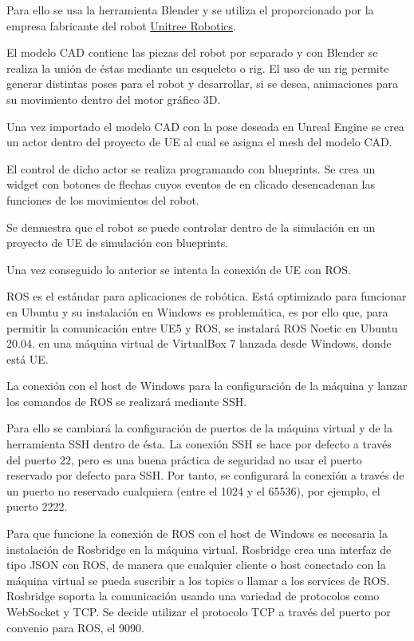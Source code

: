 \documentclass[a4paper, 12pt, spanish, twoside]{article}
\begin{document}
Para ello se usa la herramienta Blender y se utiliza el  proporcionado por la empresa fabricante del robot \href{https://www.unitree.com/}{Unitree Robotics}.  

El modelo CAD contiene las piezas del robot por separado y con Blender se realiza la unión de éstas mediante un esqueleto o rig. El uso de un rig permite generar distintas poses para el robot y desarrollar, si se desea, animaciones para su movimiento dentro del motor gráfico 3D. 

Una vez importado el modelo CAD con la pose deseada en Unreal Engine se crea un actor dentro del proyecto de UE al cual se asigna el mesh del modelo CAD.  

El control de dicho actor se realiza programando con blueprints. Se crea un widget con botones de flechas cuyos eventos de en clicado desencadenan las funciones de los movimientos del robot. 

Se demuestra que el robot se puede controlar dentro de la simulación en un proyecto de UE de simulación con blueprints. 


Una vez conseguido lo anterior se intenta la conexión de UE con ROS.  

ROS es el estándar para aplicaciones de robótica. Está optimizado para funcionar en Ubuntu y su instalación en Windows es problemática, es por ello que, para permitir la comunicación entre UE5 y ROS, se instalará ROS Noetic en Ubuntu 20.04. en una máquina virtual de VirtualBox 7 lanzada desde Windows, donde está UE.  

La conexión con el host de Windows para la configuración de la máquina y lanzar los comandos de ROS se realizará mediante SSH.  

Para ello se cambiará la configuración de puertos de la máquina virtual y de la herramienta SSH dentro de ésta. La conexión SSH se hace por defecto a través del puerto 22, pero es una buena práctica de seguridad no usar el puerto reservado por defecto para SSH. Por tanto, se configurará la conexión a través de un puerto no reservado cualquiera (entre el 1024 y el 65536), por ejemplo, el puerto 2222. 

Para que funcione la conexión de ROS con el host de Windows es necesaria la instalación de Rosbridge en la máquina virtual. Rosbridge crea una interfaz de tipo JSON con ROS, de manera que cualquier cliente o host conectado con la máquina virtual se pueda suscribir a los topics o llamar a los services de ROS. Rosbridge soporta la comunicación usando una variedad de protocolos como WebSocket y TCP. Se decide utilizar el protocolo TCP a través del puerto por convenio para ROS, el 9090. 
\end{document}
